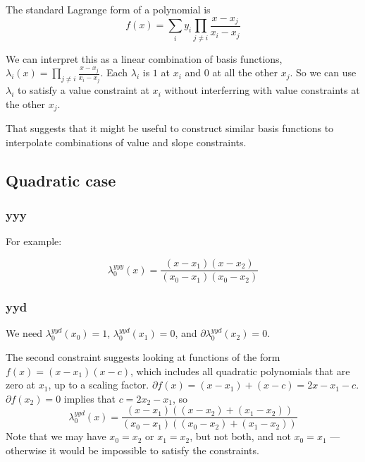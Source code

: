 The standard Lagrange form of a polynomial is
\begin{equation}
f(x) = \sum_{i} y_i \prod_{j \neq i} \frac{x - x_j}{x_i -x_j}
\end{equation}

We can interpret this as a linear combination of basis functions,
$\lambda_i (x) = \prod_{j \neq i} \frac{x - x_j}{x_i -x_j}$.
Each $\lambda_i$ is $1$ at $x_i$ and $0$ at all the other $x_j$.
So we can use $\lambda_i$ to satisfy a value constraint at $x_i$
without interferring with value constraints at the other $x_j$.

That suggests that it might be useful to construct similar basis
functions to interpolate combinations of value and slope 
constraints.

\subsection{Quadratic case}

\subsubsection{yyy}

For example:

\begin{equation}
\lambda^{yyy}_0(x) = 
\frac {(x - x_1) (x - x_2)} {(x_0 - x_1) (x_0 - x_2)}
\end{equation}

\subsubsection{yyd}

We need 
$\lambda^{yyd}_0(x_0) = 1$, 
$\lambda^{yyd}_0(x_1) = 0$, and
$\partial\lambda^{yyd}_0(x_2) = 0$. 

The second constraint suggests looking at functions of the form
$f(x) = (x - x_1) (x - c)$, which includes all quadratic 
polynomials that are zero at $x_1$, up to a scaling factor.  
$\partial{f}(x) = (x - x_1) + (x - c) = 2 x - x_1 - c$.
$\partial{f}(x_2) = 0$ implies that
$c = 2 x_2 - x_1$,
so
\begin{equation}
\lambda^{yyd}_0(x) = 
\frac 
{(x - x_1) \left( (x - x_2) + (x_1 - x_2) \right)} 
{(x_0 - x_1) ((x_0 - x_2) + (x_1 - x_2))}
\end{equation}
Note that we may have $x_0 = x_2$ or $x_1 = x_2$, but not both,
and not $x_0 = x_1$ --- otherwise it would be impossible to 
satisfy the constraints.

